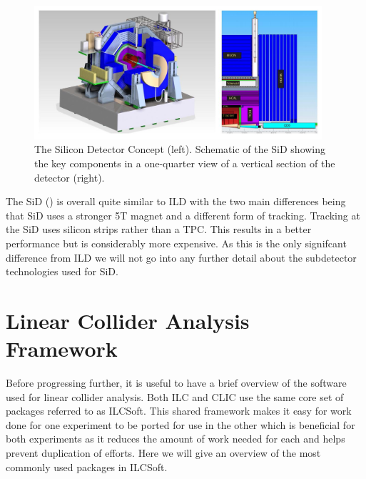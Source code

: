 \begin{figure}
  \centering
  \includegraphics[width=0.95\textwidth,keepaspectratio]{Experiments/fig/SiD}
  \caption[SiD Detector]{ The Silicon Detector Concept (left). Schematic of the SiD showing the key components in a one-quarter view of a vertical section of the detector (right). \cite{ILCTDR}}
  \label{Fig:SiD}
\end{figure}

The \ac{SiD} () is overall quite similar to ILD with the two main differences being that SiD uses a stronger 5T magnet and a different form of tracking. Tracking at the SiD uses silicon strips rather than a TPC. This results in a better performance but is considerably more expensive. As this is the only signifcant difference from ILD we will not go into any further detail about the subdetector technologies used for SiD.

\section{Linear Collider Analysis Framework}

Before progressing further, it is useful to have a brief overview of the software used for linear collider analysis. Both \ac{ILC} and \ac{CLIC} use the same core set of packages referred to as ILCSoft. This shared framework makes it easy for work done for one experiment to be ported for use in the other which is beneficial for both experiments as it reduces the amount of work needed for each and helps prevent duplication of efforts. Here we will give an overview of the most commonly used packages in ILCSoft.

